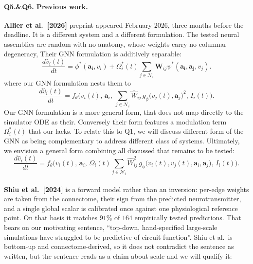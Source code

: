 \documentclass[11pt]{article}
\newcommand{\Mat}[1]{\mathbf{#1}}
\begin{document}
\paragraph{Q5.&Q6. Previous work.}
\textbf{Allier et al.\ [2026]} preprint appeared February 2026, three months
before the deadline. It is a different system and a different formulation. 
The tested neural assemblies are random with no anatomy, whose weights carry no columnar degeneracy,
Their GNN formulation is additively separable:
\begin{equation}
\frac{d\hat{v}_i(t)}{dt} =\phi^*\left(\mathbf{a_i}, v_i\right) + \Omega_i^*\left(t\right) \sum_{j\in\mathcal{N}_i} \Mat{W}_{ij}\psi^*\left(\mathbf{a_i},\mathbf{a_j},v_j\right).
\label{eqn:GNN}
\end{equation}
where our GNN formulation nests them to 
\begin{equation}
\frac{d\hat{v}_i(t)}{dt}
= f_\theta\!\Big(v_i(t),\,\mathbf{a}_i,\,
\sum_{j\in\mathcal{N}_i} \hat{W}_{ij}\,
g_\phi\!\big(v_j(t),\mathbf{a}_j\big)^2,\,
I_i(t)\Big).
\label{eq:gnn_ct}
\end{equation}
Our GNN formulation is a more general form, that does not map directly to the simulator ODE as their. Conversely their form features a modulation term $\Omega_i^*\left(t\right)$ that our lacks. 
To relate this to Q1, we will discuss different form of the GNN as being complementary to address different class of systems. Ultimately, we envision a general form combining all discussed that remains to be tested:
\begin{equation}
\frac{d\hat{v}_i(t)}{dt}
= f_\theta\!\Big(v_i(t),\,\mathbf{a}_i,\,
\Omega_i\left(t\right) \sum_{j\in\mathcal{N}_i} \hat{W}_{ij}^2\,
g_\phi\!\big(v_i(t), v_j(t),\mathbf{a}_i, \mathbf{a}_j\big),\,
I_i(t)\Big).
\label{eq:gnn_ct}
\end{equation}
\label{link9}
\\
\textbf{Shiu et al.\ [2024]} is a forward model rather than an inversion: per-edge
weights are taken from the connectome, their sign from the predicted
neurotransmitter, and a single global scalar is calibrated once against one
physiological reference point. On that basis it matches $91\%$ of $164$
empirically tested predictions.
That bears on our motivating sentence, ``top-down, hand-specified large-scale
simulations have struggled to be predictive of circuit function''. Shiu et al.\
is bottom-up and connectome-derived, so it does not contradict the sentence as
written, but the sentence reads as a claim about scale and we will qualify it:
\end{document}
